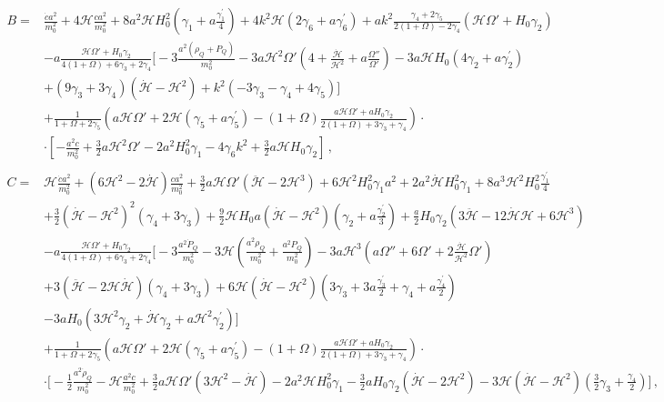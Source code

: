 \documentclass[prd,nofootinbib,showpacs]{revtex4}
\def\l{\left}
\def\r{\right}
\def\f{\frac}
\def\hub{{\mathcal H}}
\begin{document}
{\begin{align}
%
B =& \f{\dot{c}a^2}{m_0^2} +4\hub \f{c a^2}{m_0^2} +8 a^2\hub H_0^2\l(\gamma_1 +a\f{\gamma_1^\prime}{4}\r) +4k^2\hub\l(2\gamma_6 +a\gamma_6^\prime \r) + ak^2 \f{\gamma_4+2\gamma_5}{2(1+\Omega) -2\gamma_4}\l(\hub\Omega' +H_0\gamma_2\r) \nonumber\\
& -a\f{\hub \Omega' + H_0\gamma_2}{4(1+\Omega)+6\gamma_3 +2\gamma_4}\bigg[ -3\f{a^2(\rho_{Q}+P_Q)}{m_0^2} -3a\hub^2\Omega'\l( 4+ \f{\dot{\hub}}{\hub^2} +a\f{\Omega''}{\Omega'}\r) -3a\hub H_0 \l(4\gamma_2+a\gamma_2^\prime\r) \nonumber\\
& +\l(9 \gamma_3+3\gamma_4 \r)\l(\dot{\hub} -\hub^2\r) +k^2\l(-3\gamma_3-\gamma_4 +4\gamma_5 \r)\bigg]  \nonumber \\
& +\f{1}{1+\Omega+2\gamma_5}\l( a\hub\Omega' +2\hub\l(\gamma_5+a \gamma_5^\prime\r) -(1+\Omega)\f{a\hub\Omega' +aH_0\gamma_2}{2(1+\Omega) +3\gamma_3+\gamma_4}\r)\cdot \nonumber\\
&\cdot\l[-\f{a^2c}{m_0^2}+\f{3}{2}a\hub^2\Omega'-2a^2H_0^2\gamma_1-4\gamma_6k^2 +\f{3}{2}a\hub H_0\gamma_2 \r] \, , \\
%
& \nonumber \\
%
C =&  \hub\f{\dot{c}a^2}{m_0^2} +\l(6\hub^2-2\dot{\hub}\r)\f{ca^2}{m_0^2}  +\f{3}{2}a\hub\Omega'\l(\ddot{\hub} -2\hub^3\r) +6\hub^2H_0 ^2\gamma_1a^2 + 2a^2\dot{\hub} H_0^2\gamma_1 +8a^3\hub^2 H_0^2\f{\gamma_1^\prime}{4} \nonumber\\
& +\f{3}{2}\l(\dot{\hub} -\hub^2\r)^2\l(\gamma_4 +3\gamma_3\r) +\f{9}{2}\hub H_0 a\l(\dot{\hub}-\hub^2\r)\l(\gamma_2+a\f{\gamma_2^\prime}{3}\r) +\f{a}{2}H_0\gamma_2\l(3\ddot{\hub}-12\dot{\hub}\hub +6\hub^3\r) \nonumber \\
& -a\f{\hub \Omega' + H_0\gamma_2}{4(1+\Omega)+6\gamma_3+2\gamma_4}\bigg[ -3\f{a^2\dot{P}_Q}{m_0^2}-3\hub \l(\f{a^2\rho_Q}{m_0^2} +\f{a^2 P_Q}{m_0^2}\r) -3a\hub^3\l(a\Omega'' +6\Omega' +2\f{\dot{\hub}}{\hub^2}\Omega' \r) \nonumber\\
& +3\l(\ddot{\hub}-2\hub \dot{\hub}\r)\l(\gamma_4 +3\gamma_3\r) +6\hub\l(\dot{\hub}-\hub^2\r)\l(3\gamma_3+3a\f{\gamma_3^\prime}{2} +\gamma_4+a\f{\gamma_4^\prime}{2}\r) \nonumber \\
& -3a H_0\l(3\hub^2\gamma_2+\dot{\hub}\gamma_2 +a\hub^2\gamma_2^\prime\r) \bigg] \nonumber \\
& +\f{1}{1+\Omega+2\gamma_5}\l( a\hub\Omega' +2\hub\l(\gamma_5+a\gamma_5^\prime\r) -(1+\Omega)\f{a\hub\Omega' +aH_0\gamma_2}{2(1+\Omega) +3\gamma_3+\gamma_4}\r)\cdot \nonumber\\
&\cdot\bigg[ -\f{1}{2}\f{a^2\dot{\rho}_Q}{m_0^2} -\hub\f{a^2c}{m_0^2} +\f{3}{2}a\hub\Omega'\l(3\hub^2 -\dot{\hub}\r) -2a^2\hub H_0^2\gamma_1 -\f{3}{2}aH_0\gamma_2\l(\dot{\hub}-2\hub^2\r) -3\hub\l(\dot{\hub}-\hub^2\r)\l(\f{3}{2}\gamma_3 + \f{\gamma_4}{2}\r)\bigg] \, ,\nonumber\\

\end{align}}
\end{document}
